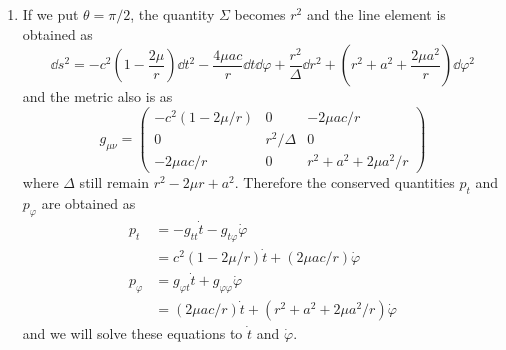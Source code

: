 \documentclass[a4paper,pdftex,10pt]{article}
\begin{document}
\maketitle

\begin{enumerate}
  \item
        If we put $\theta=\pi/2$, the quantity $\Sigma$ becomes $r^2$ and the line element is obtained as
        \begin{equation}
          \dd s^2
          =
          -
          c^2
          \left( 1-\frac{2\mu}{r} \right)\dd t^2
          -
          \frac{4\mu ac}{r}\dd t\dd \varphi
          +
          \frac{r^2}{\Delta}\dd r^2
          +
          \left(
          r^2+a^2+\frac{2\mu a^2}{r}
          \right)
          \dd\varphi^2
        \end{equation}
        and the metric also is as
        \begin{equation}
          g_{\mu\nu}
          =
          \begin{pmatrix}
            -c^2(1-2\mu/r) & 0          & -2\mu ac/r           \\
            0              & r^2/\Delta & 0                    \\
            -2\mu ac/r     & 0          & r^2 + a^2 +2\mu a^2/r
          \end{pmatrix}
        \end{equation}
        where $\Delta$ still remain $r^2-2\mu r+a^2$. Therefore the conserved quantities $p_{t}$ and $p_{\varphi}$ are obtained as 
        \begin{align}
          p_{t}
          &=
          -g_{tt}\dot{t}-g_{t\varphi}\dot{\varphi}
          \nonumber
          \\
          &=
          c^2(1-2\mu/r)\dot{t}
          +
          (2\mu ac/r)\dot{\varphi}
          \\
          p_{\varphi}
          &=
          g_{\varphi t}\dot{t}+g_{\varphi\varphi}\dot{\varphi}
          \nonumber
          \\
          &=
          (2\mu ac/r) \dot{t}
          +
          (r^2 + a^2 +2\mu a^2/r)\dot{\varphi}
        \end{align} 
        and we will solve these equations to $\dot{t}$ and $\dot{\varphi}$.

        











\end{enumerate}
\end{document}
